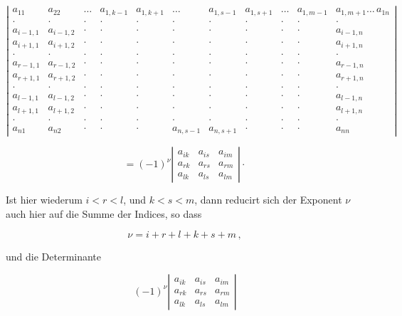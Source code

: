 \[
\left|
\begin{array}{ccccccccccc}
a_{11} & a_{22} & \dots & a_{1,k-1} & a_{1,k+1} & \dots & a_{1,s-1} & a_{1,s+1} & \dots & a_{1,m-1} & a_{1,m+1} \dots\, a_{1n} \\
\cdot & \cdot & \cdot & \cdot & \cdot & \cdot & \cdot & \cdot & \cdot & \cdot & \cdot \\
a_{i-1,1} & a_{i-1,2} & \cdot & \cdot & \cdot & \cdot & \cdot & \cdot & \cdot & \cdot & a_{i-1,n} \\
a_{i+1,1} & a_{i+1,2} & \cdot & \cdot & \cdot & \cdot & \cdot & \cdot & \cdot & \cdot & a_{i+1,n} \\
\cdot & \cdot & \cdot & \cdot & \cdot & \cdot & \cdot & \cdot & \cdot & \cdot & \cdot \\
a_{r-1,1} & a_{r-1,2} & \cdot & \cdot & \cdot & \cdot & \cdot & \cdot & \cdot & \cdot & a_{r-1,n} \\
a_{r+1,1} & a_{r+1,2} & \cdot & \cdot & \cdot & \cdot & \cdot & \cdot & \cdot & \cdot & a_{r+1,n} \\
\cdot & \cdot & \cdot & \cdot & \cdot & \cdot & \cdot & \cdot & \cdot & \cdot & \cdot \\
a_{l-1,1} & a_{l-1,2} & \cdot & \cdot & \cdot & \cdot & \cdot & \cdot & \cdot & \cdot & a_{l-1,n} \\
a_{l+1,1} & a_{l+1,2} & \cdot & \cdot & \cdot & \cdot & \cdot & \cdot & \cdot & \cdot & a_{l+1,n} \\
\cdot & \cdot & \cdot & \cdot & \cdot & \cdot & \cdot & \cdot & \cdot & \cdot & \cdot \\
a_{n1} & a_{n2} & \cdot & \cdot & \cdot & a_{n,s-1} & a_{n,s+1} & \cdot & \cdot & \cdot & a_{nn}
\end{array}
\right|
\]

\[
= (-1)^\nu \left|\begin{array}{ccc} a_{ik} & a_{is} & a_{im} \\ a_{rk} & a_{rs} & a_{rm} \\
a_{lk} & a_{ls} & a_{lm} \end{array}\right| \cdot
\]

Ist hier wiederum $i<r<l$, und $k<s<m$, dann reducirt sich der Exponent $\nu$ auch hier auf die
Summe der Indices, so dass

\[
\nu = i+r+l+k+s+m\,,
\]

und die Determinante

\[
(-1)^\nu \left|\begin{array}{ccc} a_{ik} & a_{is} & a_{im} \\ a_{rk} & a_{rs} & a_{rm} \\
a_{lk} & a_{ls} & a_{lm} \end{array}\right|
\]

